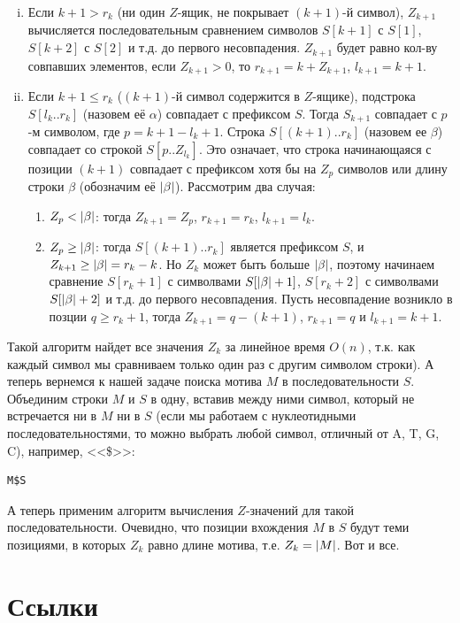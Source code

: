 \documentclass[letterpaper, 11pt]{article}
\DeclarePairedDelimiter{\abs}{\lvert}{\rvert}
\begin{document}
\begin{enumerate}[(i)]
\item
Если $k + 1 > r_k$ (ни один $Z$-ящик, не покрывает $(k+1)$-й символ), $Z_{k+1}$ вычисляется последовательным сравнением символов $S[k+1]$ с $S[1]$, $S[k+2]$ с $S[2]$ и т.д. до первого несовпадения. $Z_{k+1}$ будет равно кол-ву совпавших элементов, если $Z_{k+1} > 0$, то $r_{k+1} = k + Z_{k+1}$, $l_{k+1} = k + 1$.
\item
Если $k + 1 \leq r_k$ ($(k+1)$-й символ содержится в $Z$-ящике), подстрока $S[l_k..r_k]$ (назовем её $\alpha$) совпадает с префиксом $S$. Тогда $S_{k+1}$ совпадает с $p$-м символом, где $p = k + 1 - l_k + 1$. Строка $S[(k+1)..r_k]$ (назовем ее $\beta$) совпадает со строкой $S[p..Z_{l_k}]$. Это означает, что строка начинающаяся с позиции $(k+1)$ совпадает с префиксом хотя бы на $Z_{p}$ символов или длину строки $\beta$ (обозначим её $\abs{\beta}$). Рассмотрим два случая:
\begin{enumerate}
 \item
 $Z_{p} < \abs{\beta}$: тогда $Z_{k+1} = Z_{p}$, $r_{k+1} = r_{k}$, $l_{k+1} = l_k$.
 \item
 $Z_{p} \geq \abs{\beta}$: тогда $S[(k+1)..r_k]$ является префиксом $S$, и $Z_{k+1} \geq \abs{\beta} = r_k - k$. Но $Z_k$ может быть больше $\abs{\beta}$, поэтому начинаем сравнение $S[r_k + 1]$ с символвами $S[\abs{\beta} + 1]$, $S[r_k + 2]$ с символвами $S[\abs{\beta} + 2]$ и т.д. до первого несовпадения. Пусть несовпадение возникло в позции $q \geq r_k + 1$, тогда $Z_{k+1} = q - (k +1)$, $r_{k+1} = q$ и $l_{k+1} = k + 1$.
\end{enumerate}
\end{enumerate}
\par
Такой алгоритм найдет все значения $Z_k$ за линейное время $O(n)$, т.к. как каждый символ мы сравниваем только один раз с другим символом строки). А теперь вернемся к нашей задаче поиска мотива $M$ в последовательности $S$. Объединим строки $M$ и $S$ в одну, вставив между ними символ, который не встречается ни в $M$ ни в $S$ (если мы работаем с нуклеотидными последовательностями, то можно выбрать любой символ, отличный от A, T, G, C), например, <<\$>>:
\begin{verbatim}
M$S
\end{verbatim}
\par
А теперь применим алгоритм вычисления $Z$-значений для такой последовательности. Очевидно, что позиции вхождения $M$ в $S$ будут теми позициями, в которых $Z_k$ равно длине мотива, т.е. $Z_k = \abs{M}$. Вот и все.
\section{Ссылки}
\end{document}
